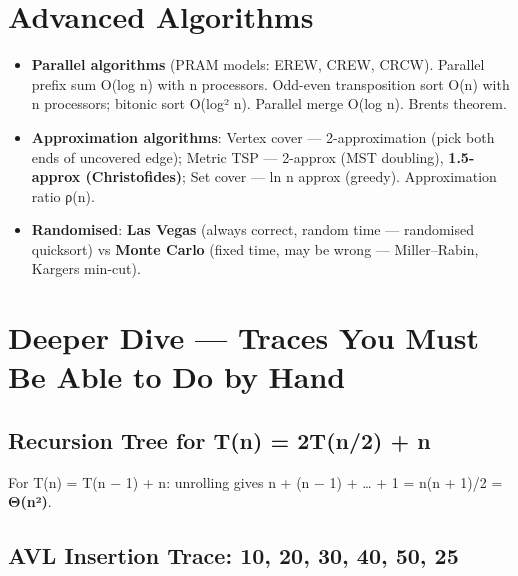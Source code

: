 \hypertarget{p2-07--12-advanced-algorithms}{%
\section{Advanced Algorithms}\label{p2-07--12-advanced-algorithms}}

\begin{itemize}
\tightlist
\item
  \textbf{Parallel algorithms} (PRAM models: EREW, CREW, CRCW). Parallel prefix sum O(log n) with n processors. Odd-even transposition sort O(n) with n processors; bitonic sort O(log² n). Parallel merge O(log n). Brent\textquotesingle s theorem.
\item
  \textbf{Approximation algorithms}: Vertex cover --- 2-approximation (pick both ends of uncovered edge); Metric TSP --- 2-approx (MST doubling), \textbf{1.5-approx (Christofides)}; Set cover --- ln n approx (greedy). Approximation ratio ρ(n).
\item
  \textbf{Randomised}: \textbf{Las Vegas} (always correct, random time --- randomised quicksort) vs \textbf{Monte Carlo} (fixed time, may be wrong --- Miller--Rabin, Karger\textquotesingle s min-cut).
\end{itemize}

\needspace{131pt}

\hypertarget{p2-07--13-deeper-dive--traces-you-must-be-able-to-do-by-hand}{%
\section{Deeper Dive --- Traces You Must Be Able to Do by Hand}\label{p2-07--13-deeper-dive--traces-you-must-be-able-to-do-by-hand}}

\needspace{95pt}

\hypertarget{p2-07--131-recursion-tree-for-tn--2tn2--n}{%
\subsection{Recursion Tree for T(n) = 2T(n/2) + n}\label{p2-07--131-recursion-tree-for-tn--2tn2--n}}



For T(n) = T(n − 1) + n: unrolling gives n + (n − 1) + \ldots{} + 1 = n(n + 1)/2 = \textbf{Θ(n²)}.

\needspace{95pt}

\hypertarget{p2-07--132-avl-insertion-trace-10-20-30-40-50-25}{%
\subsection{AVL Insertion Trace: 10, 20, 30, 40, 50, 25}\label{p2-07--132-avl-insertion-trace-10-20-30-40-50-25}}

